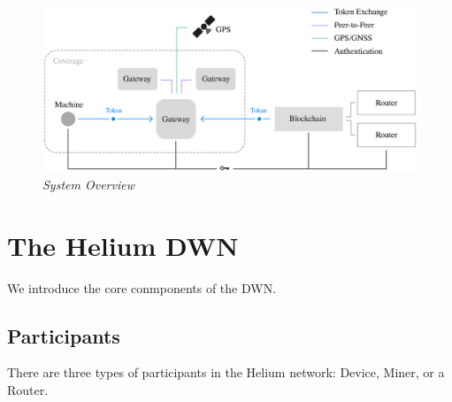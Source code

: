 \documentclass[10pt, nonatbib, nocopyrightspace, reprint]{sigplanconf}
\begin{document}
\begin{figure}[ht]
    \begin{center}
          \includegraphics[width=\textwidth]{schematic.eps}
          \caption{\emph{System Overview}}\label{fig:system}
     \end{center}
\end{figure}


\section{The Helium DWN}

We introduce the core conmponents of the DWN.

\subsection{Participants}

There are three types of participants in the Helium network: Device, Miner, or a Router.
\end{document}
